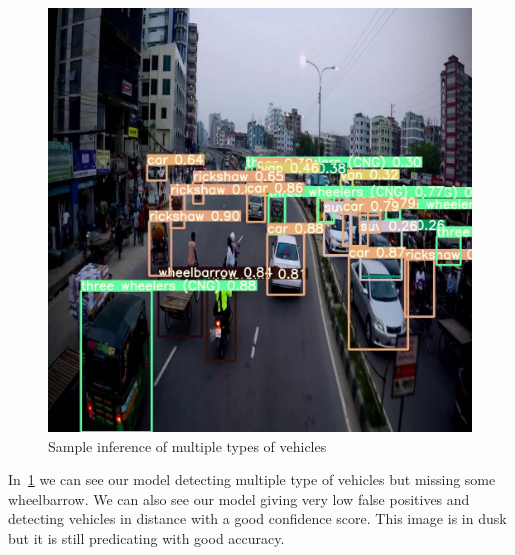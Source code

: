 \begin{figure}[h]
    \centering
    \includegraphics[max width=\textwidth]{images/ours/3 (2).jpg}
   \caption[Sample Inference of Vehicles 5]{ Sample inference of multiple types of vehicles}
    \label{fig:inference875}
\end{figure}

In~\ref{fig:inference875} we can see our model detecting multiple type of vehicles but missing some wheelbarrow. We can also see our model giving very low false positives and detecting vehicles in distance with a good confidence score. This image is in dusk but it is still predicating with good accuracy.

\newpage

